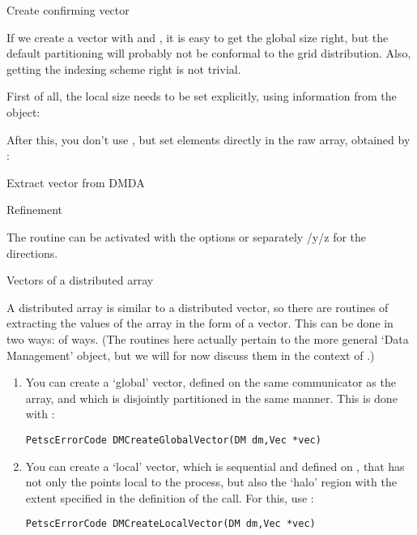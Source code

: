 {Create confirming vector}

If we create a vector with  and ,
it is easy to get the global size right, but the default partitioning will
probably not be conformal to the grid distribution.
Also, getting the indexing scheme right is not trivial.

First of all, the local size needs to be set explicitly,
using information from the  object:
%

After this, you don't use , but
set elements directly in the raw array, obtained by :
%

 {Extract vector from DMDA}

 {Refinement}

The routine 
can be activated with the options 
or separately /y/z for the directions.

 {Vectors of a distributed array}

A distributed array is similar to a distributed vector, so there are routines of
extracting the values of the array in the form of a vector. This can be done in two ways:
of ways.
%
(The routines here actually pertain to the more general  `Data Management'
object, but we will for now discuss them in the context of .)
%
\begin{enumerate}
\item You can create a `global' vector, defined on the same communicator as the array,
  and which is disjointly partitioned in the same manner. This is done with
  :
\begin{lstlisting}
PetscErrorCode DMCreateGlobalVector(DM dm,Vec *vec)    
\end{lstlisting}
\item You can create a `local' vector,
  which is sequential and defined on ,
  that has not only the points local to the process, but also the `halo' region
  with the extent specified in the definition of the  call.
  For this, use :
\begin{lstlisting}
PetscErrorCode DMCreateLocalVector(DM dm,Vec *vec)
\end{lstlisting}
\end{enumerate}

